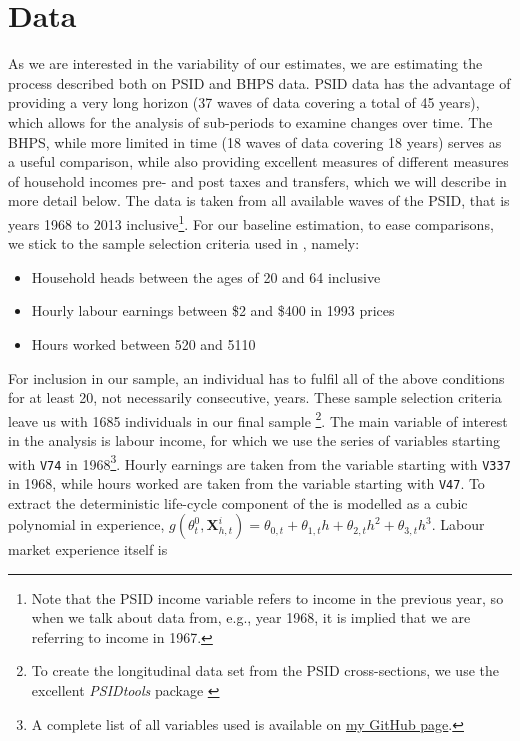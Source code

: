 \section{Data}
As we are interested in the variability of our estimates, we are estimating the
process described both on PSID and BHPS data. PSID data has the advantage of
providing a very long horizon (37 waves of data covering a total of 45 years),
which allows for the analysis of sub-periods to examine changes over time. The
BHPS, while more limited in time (18 waves of data covering 18 years) serves as
a useful comparison, while also providing excellent measures of different
measures of household incomes pre- and post taxes and transfers, which we will
describe in more detail below. 
The data is taken from all available waves of the PSID, that is years 1968 to
2013 inclusive\footnote{Note that the PSID income variable refers to income in
the previous year, so when we talk about data from, e.g., year 1968, it is
implied that we are referring to income in 1967.}. For our baseline estimation,
to ease comparisons, we stick to the sample selection criteria used in
\citet{Guvenen2009}, namely:
\begin{itemize}
	\item Household heads between the ages of 20 and 64 inclusive
    \item Hourly labour earnings between \$2 and \$400 in 1993 prices
    \item Hours worked between 520 and 5110
\end{itemize}
For inclusion in our sample, an individual has to fulfil all of the above
conditions for at least 20, not necessarily consecutive, years. These sample
selection criteria leave us with 1685 individuals in our final sample
\footnote{To create the longitudinal data set from the PSID cross-sections, we
use the excellent \textit{PSIDtools} package \citep{Kohler2015}}. The main
variable of interest in the analysis is labour income, for which we use the
series of variables starting with \texttt{V74} in 1968\footnote{A complete list
of all variables used is available on
\href{https://github.com/nilshg/psidJulia/blob/master/create_panel.do}{my GitHub
page}.}. Hourly earnings are taken from the variable starting with \texttt{V337}
in 1968, while hours worked are taken from the variable starting with
\texttt{V47}. To extract the deterministic life-cycle component of the is 
modelled as a cubic polynomial in experience,
$g(\theta_t^0, \pmb{X}_{h,t}^i) = \theta_{0,t} + \theta_{1,t} h 
+ \theta_{2,t} h^2 + \theta_{3,t} h^3$. Labour market experience itself is 

